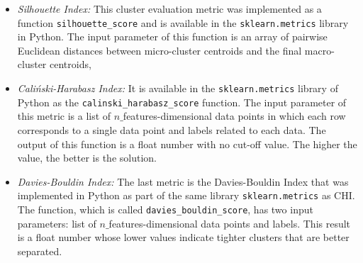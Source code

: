 \begin{itemize}
    

\item\textit{Silhouette Index:}
This cluster evaluation metric was implemented as a function \texttt{silhouette\_score} and is available in the \texttt{sklearn.metrics} library in Python.  The input parameter of this function is an array of pairwise Euclidean distances between micro-cluster centroids and the final macro-cluster centroids, %





\item\textit{Caliński-Harabasz Index:}
It is available in the \texttt{sklearn.metrics} library of Python as the \texttt{calinski\_harabasz\_score} function. The input parameter of this metric is a list of $n\_$features-dimensional data points in which each row corresponds to a single data point and labels related to each data. The output of this function is a float number with no cut-off value. The higher the value, the better is the solution.




\item\textit{Davies-Bouldin Index:}
The last metric is the Davies-Bouldin Index that was implemented in Python as part of the same library \texttt{sklearn.metrics} as CHI. The function, which is called \texttt{davies\_bouldin\_score}, has two input parameters: list of $n\_$features-dimensional data points and labels. This result is a float number whose lower values indicate tighter clusters that are better separated.




\end{itemize}


